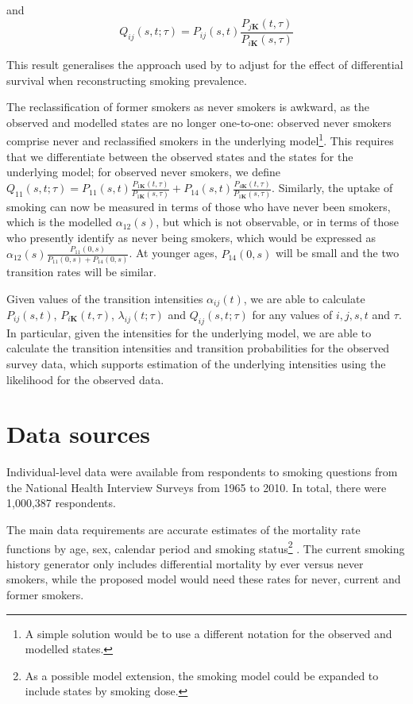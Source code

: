 \documentclass[11pt,a4paper]{article}
\newcommand{\K}{\ensuremath{\bm{K}}}
\begin{document}
\noindent and
\[Q_{ij}(s,t;\tau)=P_{ij}(s,t)\frac{P_{j\K}(t,\tau)}{P_{i\K}(s,\tau)}
\]

This result generalises the approach used by
\citet{harris_cigarette_1983} to adjust for the effect of differential
survival when reconstructing smoking prevalence.

The reclassification of former smokers as never smokers is awkward, as the observed and modelled states are no longer one-to-one: observed never smokers comprise never and reclassified smokers in the underlying model\footnote{A simple solution would be to use a different notation for the observed and modelled states.}. This requires that we differentiate between the observed states and the states for the underlying model; for observed never smokers, we define $Q_{11}(s,t;\tau)=P_{11}(s,t)\frac{P_{1\K}(t,\tau)}{P_{1\K}(s,\tau)}+P_{14}(s,t)\frac{P_{4\K}(t,\tau)}{P_{1\K}(s,\tau)}$. Similarly, the uptake of smoking can now be measured in terms of those who have never been smokers, which is the modelled $\alpha_{12}(s)$, but which is not observable, or in terms of those who presently identify as never being smokers, which would be expressed as $\alpha_{12}(s)\frac{P_{11}(0,s)}{P_{11}(0,s)+P_{14}(0,s)}$. At younger ages, $P_{14}(0,s)$ will be small and the two transition rates will be similar.

Given values of the transition intensities $\alpha_{ij}(t)$, we are
able to calculate $P_{ij}(s,t)$, $P_{i\K}(t,\tau)$,
$\lambda_{ij}(t;\tau)$ and $Q_{ij}(s,t;\tau)$ for any values of
$i,j,s,t$ and $\tau$.  In particular, given the intensities for the
underlying model, we are able to calculate the transition intensities
and transition probabilities for the observed survey data, which supports estimation of the underlying intensities using the likelihood for the observed data.


\section{Data sources}


Individual-level data were available from respondents to smoking questions from the National Health Interview Surveys from 1965 to 2010. In total, there were 1,000,387 respondents. 

The main data requirements are accurate estimates of the mortality
rate functions by age, sex, calendar period and smoking
status\footnote{As a possible model extension, the smoking model could
  be expanded to include states by smoking dose.}  . The current
smoking history generator only includes differential mortality by ever
versus never smokers, while the proposed model would need these rates
for never, current and former smokers.
\end{document}
